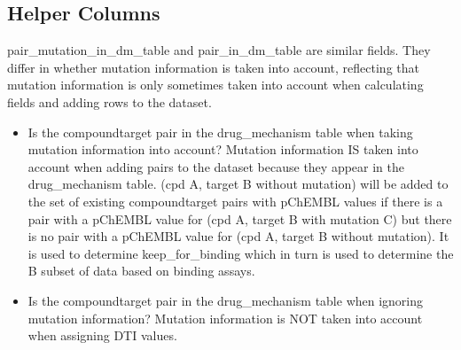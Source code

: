 \documentclass[letterpaper,10pt,english]{sphinxmanual}
\begin{document}
\subsection{Helper Columns}
\label{\detokenize{columns_docs:id11}}
\sphinxAtStartPar
pair\_mutation\_in\_dm\_table and pair\_in\_dm\_table are similar fields.
They differ in whether mutation information is taken into account,
reflecting that mutation information is only sometimes taken into account
when calculating fields and adding rows to the dataset.
\begin{itemize}
\item {} \begin{description}
\sphinxAtStartPar
Is the compound\sphinxhyphen{}target pair in the drug\_mechanism table
when taking mutation information into account?
Mutation information IS taken into account when adding pairs to the dataset
because they appear in the drug\_mechanism table.
(cpd A, target B without mutation) will be added to the set of existing
compound\sphinxhyphen{}target pairs with pChEMBL values
if there is a pair with a pChEMBL value for (cpd A, target B with mutation C)
but there is no pair with a pChEMBL value for (cpd A, target B without mutation).
It is used to determine keep\_for\_binding which in turn is used
to determine the B subset of data based on binding assays.

\end{description}

\item {} \begin{description}
\sphinxAtStartPar
Is the compound\sphinxhyphen{}target pair in the drug\_mechanism table
when ignoring mutation information?
Mutation information is NOT taken into account when assigning DTI values.

\end{description}

\end{itemize}
\end{document}
